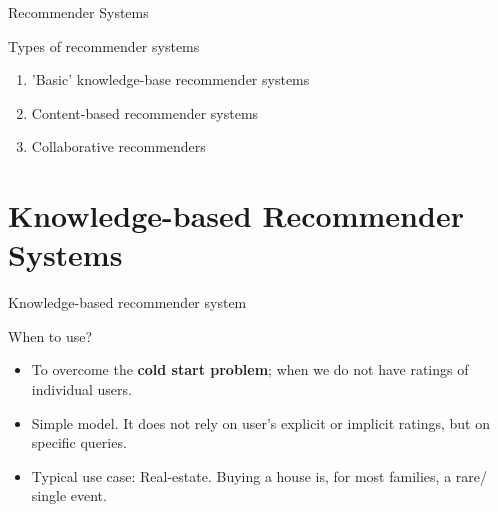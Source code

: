 \documentclass[handout]{beamer}
\begin{document}
\begin{frame}{Recommender Systems} 
\begin{block}{Types of recommender systems  \parencite{Wieland2021, Locherbach2018, Moller2018}}
	\begin{enumerate}
		\item 'Basic' knowledge-base recommender systems
		\item Content-based recommender systems
		\item Collaborative  recommenders 
	\end{enumerate}
\end{block}{\tiny }
\end{frame}

\section[Knowledge-based RecSys]{Knowledge-based Recommender Systems}
\begin{frame}{Knowledge-based recommender system} 
\begin{block}{When to use?}
	\begin{itemize}
		\item<2-> To overcome the \textbf{cold start problem}; when we do not have ratings of individual users. 
		\item<3-> Simple model. It does not rely on user's explicit or implicit ratings, but on specific queries.
		\item<4-> Typical use case: Real-estate. Buying a house is, for most families, a rare/ single event. 
	\end{itemize}
\end{block}
\end{frame}


\begin{frame}
\end{frame}
\end{document}
